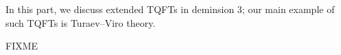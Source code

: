 In this part, we discuss extended TQFTs in deminsion 3;
our main example of such TQFTs is Turaev--Viro theory.

FIXME